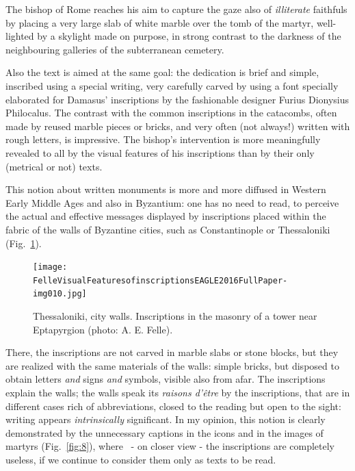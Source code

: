 \documentclass[amsthm,ebook]{saparticle}
\begin{document}
The bishop of Rome reaches his aim to capture the gaze also of \emph{illiterate} faithfuls by placing a very large slab of
white marble over the tomb of the martyr, well-lighted by a skylight made on purpose, in strong contrast to the
darkness of the neighbouring galleries of the subterranean cemetery. 

Also the text is aimed at the same goal: the dedication is brief and simple, inscribed using a special writing, very
carefully carved by using a font specially elaborated for Damasus' inscriptions by the fashionable designer Furius
Dionysius Philocalus. The contrast with the common inscriptions in the catacombs, often made by reused marble pieces or
bricks, and very often (not always!) written with rough letters, is impressive. The bishop's intervention is more
meaningfully revealed to all by the visual features of his inscriptions than by their only (metrical or not) texts. 

This notion about written monuments is more and more diffused in Western Early Middle Ages and also in Byzantium: one
has no need to read, to perceive the actual and effective messages displayed by inscriptions placed within the fabric
of the walls of Byzantine cities, such as Constantinople or Thessaloniki (Fig.~\ref{fig:7}).

\begin{figure}[!bp]
\centering
 \texttt{[image: FelleVisualFeaturesofinscriptionsEAGLE2016FullPaper-img010.jpg]}
\caption{Thessaloniki, city walls. Inscriptions in the masonry of a tower near Eptapyrgion (photo: A. E. Felle).}
\label{fig:7}
\end{figure}







There, the inscriptions are not carved in marble slabs or stone blocks, but they are realized with the same materials of
the walls: simple bricks, but disposed to obtain letters \emph{and} signs \emph{and} symbols, visible also from afar. The
inscriptions explain the walls; the walls speak its \emph{raisons d'être} by the inscriptions, that are in different cases
rich of abbreviations, closed to the reading but open to the sight: writing appears \emph{intrinsically} significant. In my
opinion, this notion is clearly demonstrated by the unnecessary captions in the icons and in the images of martyrs
(Fig.~\ref{fig:8}), where \ {}- on closer view - the inscriptions are completely useless, if we continue to consider them only as
texts to be read. 
\end{document}
